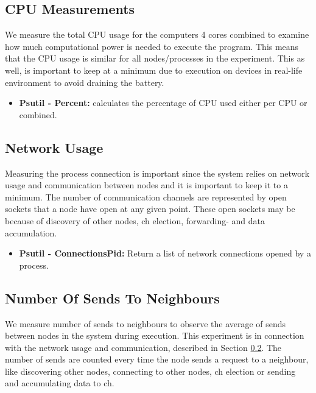 \documentclass[USenglish]{uit-thesis}
\begin{document}
\subsection{CPU Measurements} \label{eva:cpu_measure}
We measure the total CPU usage for the computers 4 cores combined to examine how much computational power is needed to execute the program. This means that the CPU usage is similar for all nodes/processes in the experiment.
This as well, is important to keep at a minimum due to execution on devices in real-life environment to avoid draining the battery.


\begin{itemize}
\item \textbf{Psutil - Percent:} calculates the percentage of CPU used either per CPU or combined.
\end{itemize}


\subsection{Network Usage} \label{eva:net_measure}

Measuring the process connection is important since the system relies on network usage and communication between nodes and it is important to keep it to a minimum. The number of communication channels are represented by open sockets that a node have open at any given point. These open sockets may be because of discovery of other nodes, \gls{ch} election, forwarding- and data accumulation.

\begin{itemize}
\item \textbf{Psutil - ConnectionsPid:} Return a list of network connections opened by a process.
\end{itemize}



\subsection{Number Of Sends To Neighbours} \label{eva:num_sends}
We measure number of sends to neighbours to observe the average of sends between nodes in the system during execution. This experiment is in connection with the network usage and communication, described in Section \ref{eva:net_measure}. The number of sends are counted every time the node sends a request to a neighbour, like discovering other nodes, connecting to other nodes, \gls{ch} election or sending and accumulating data to \gls{ch}.
\end{document}
